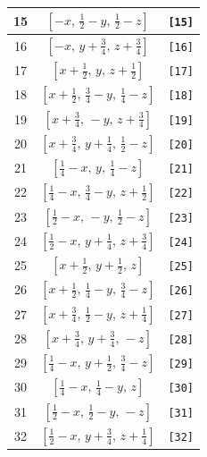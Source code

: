 \documentclass[fleqn,8pt]{jsarticle}
\begin{document}
\begin{longtable}{ccc}
15 & $\left[ - x,\, \frac{1}{2} - y,\, \frac{1}{2} - z \right]$ & {\tt [15]} \\ \hline
16 & $\left[ - x,\, y + \frac{3}{4},\, z + \frac{3}{4} \right]$ & {\tt [16]} \\ \hline
17 & $\left[ x + \frac{1}{2},\, y,\, z + \frac{1}{2} \right]$ & {\tt [17]} \\ \hline
18 & $\left[ x + \frac{1}{2},\, \frac{3}{4} - y,\, \frac{1}{4} - z \right]$ & {\tt [18]} \\ \hline
19 & $\left[ x + \frac{3}{4},\, - y,\, z + \frac{3}{4} \right]$ & {\tt [19]} \\ \hline
20 & $\left[ x + \frac{3}{4},\, y + \frac{1}{4},\, \frac{1}{2} - z \right]$ & {\tt [20]} \\ \hline
21 & $\left[ \frac{1}{4} - x,\, y,\, \frac{1}{4} - z \right]$ & {\tt [21]} \\ \hline
22 & $\left[ \frac{1}{4} - x,\, \frac{3}{4} - y,\, z + \frac{1}{2} \right]$ & {\tt [22]} \\ \hline
23 & $\left[ \frac{1}{2} - x,\, - y,\, \frac{1}{2} - z \right]$ & {\tt [23]} \\ \hline
24 & $\left[ \frac{1}{2} - x,\, y + \frac{1}{4},\, z + \frac{3}{4} \right]$ & {\tt [24]} \\ \hline
25 & $\left[ x + \frac{1}{2},\, y + \frac{1}{2},\, z \right]$ & {\tt [25]} \\ \hline
26 & $\left[ x + \frac{1}{2},\, \frac{1}{4} - y,\, \frac{3}{4} - z \right]$ & {\tt [26]} \\ \hline
27 & $\left[ x + \frac{3}{4},\, \frac{1}{2} - y,\, z + \frac{1}{4} \right]$ & {\tt [27]} \\ \hline
28 & $\left[ x + \frac{3}{4},\, y + \frac{3}{4},\, - z \right]$ & {\tt [28]} \\ \hline
29 & $\left[ \frac{1}{4} - x,\, y + \frac{1}{2},\, \frac{3}{4} - z \right]$ & {\tt [29]} \\ \hline
30 & $\left[ \frac{1}{4} - x,\, \frac{1}{4} - y,\, z \right]$ & {\tt [30]} \\ \hline
31 & $\left[ \frac{1}{2} - x,\, \frac{1}{2} - y,\, - z \right]$ & {\tt [31]} \\ \hline
32 & $\left[ \frac{1}{2} - x,\, y + \frac{3}{4},\, z + \frac{1}{4} \right]$ & {\tt [32]} \\
\end{longtable}
\end{document}

